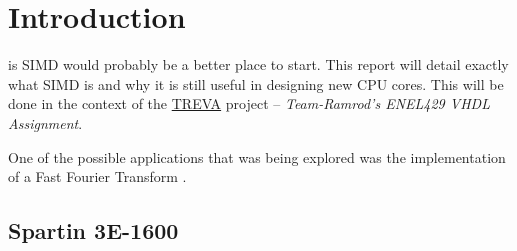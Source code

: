 \section{Introduction}

 is SIMD would probably be a better place to start.  This
report will detail exactly what SIMD is and why it is still useful in designing
new CPU cores.  This will be done in the context of the
\href{https://github.com/team-ramrod/treva}{TREVA} project --
\emph{Team-Ramrod's ENEL429 VHDL Assignment}.

One of the possible applications that was being explored was the implementation
of a Fast Fourier Transform \cite{Jamieson198648}.


\subsection{Spartin 3E-1600} %

